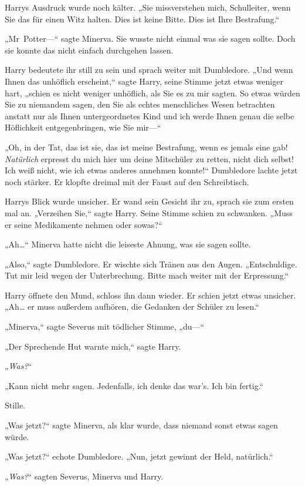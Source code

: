 {Harrys Ausdruck wurde noch kälter. „Sie missverstehen mich, Schulleiter, wenn Sie das für einen Witz halten. Dies ist keine Bitte. Dies ist Ihre Bestrafung.“

„Mr~Potter—“ sagte Minerva. Sie wusste nicht einmal was sie sagen sollte. Doch sie konnte das nicht einfach durchgehen lassen.

Harry bedeutete ihr still zu sein und sprach weiter mit Dumbledore. „Und wenn Ihnen das unhöflich erscheint,“ sagte Harry, seine Stimme jetzt etwas weniger hart, „schien es nicht weniger unhöflich, als Sie es zu mir sagten. So etwas würden Sie zu niemandem sagen, den Sie als echtes menschliches Wesen betrachten anstatt nur als Ihnen untergeordnetes Kind und ich werde Ihnen genau die selbe Höflichkeit entgegenbringen, wie Sie mir—“

„Oh, in der Tat, das ist sie, das ist meine Bestrafung, wenn es jemals eine gab! \emph{Natürlich} erpresst du mich hier um deine Mitschüler zu retten, nicht dich selbst! Ich weiß nicht, wie ich etwas anderes annehmen konnte!“ Dumbledore lachte jetzt noch stärker. Er klopfte dreimal mit der Faust auf den Schreibtisch.

Harrys Blick wurde unsicher. Er wand sein Gesicht ihr zu, sprach sie zum ersten mal an. „Verzeihen Sie,“ sagte Harry. Seine Stimme schien zu schwanken. „Muss er seine Medikamente nehmen oder sowas?“

„Ah…“ Minerva hatte nicht die leiseste Ahnung, was sie sagen sollte.

„Also,“ sagte Dumbledore. Er wischte sich Tränen aus den Augen. „Entschuldige. Tut mir leid wegen der Unterbrechung. Bitte mach weiter mit der Erpressung.“

Harry öffnete den Mund, schloss ihn dann wieder. Er schien jetzt etwas unsicher. „Ah… er muss außerdem aufhören, die Gedanken der Schüler zu lesen.“

„Minerva,“ sagte Severus mit tödlicher Stimme, „du—“

„Der Sprechende Hut warnte mich,“ sagte Harry.

„\emph{Was?}“

„Kann nicht mehr sagen. Jedenfalls, ich denke das war's. Ich bin fertig.“

Stille.

„Was jetzt?“ sagte Minerva, als klar wurde, dass niemand sonst etwas sagen würde.

„Was jetzt?“ echote Dumbledore. „Nun, jetzt gewinnt der Held, natürlich.“

„\emph{Was?}“ sagten Severus, Minerva und Harry.

}
